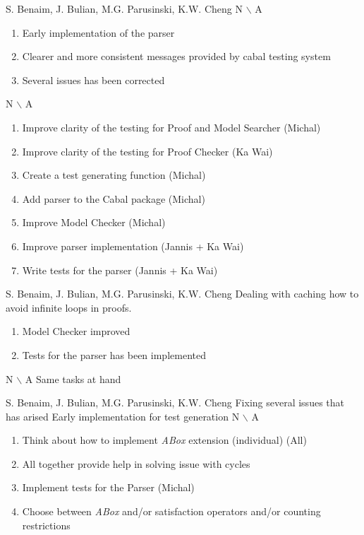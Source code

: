 %
{S. Benaim, J. Bulian, M.G. Parusinski, K.W. Cheng}%
{{N $\backslash$ A}}%
{\begin{enumerate}
\item Early implementation of the parser
\item Clearer and more consistent messages provided by cabal testing system
\item Several issues has been corrected
\end{enumerate}}%
{N $\backslash$ A}
{\begin{enumerate}
\item Improve clarity of the testing for Proof and Model Searcher (Michal)
\item Improve clarity of the testing for Proof Checker (Ka Wai)
\item Create a test generating function (Michal)
\item Add parser to the Cabal package (Michal)
\item Improve Model Checker (Michal)
\item Improve parser implementation (Jannis + Ka Wai)
\item Write tests for the parser (Jannis + Ka Wai)
\end{enumerate}}%

%
{S. Benaim, J. Bulian, M.G. Parusinski, K.W. Cheng}%
{Dealing with caching how to avoid infinite loops in proofs.}%
{\begin{enumerate}
\item Model Checker improved
\item Tests for the parser has been implemented
\end{enumerate}}%
{N $\backslash$ A}
{Same tasks at hand}%

%
{S. Benaim, J. Bulian, M.G. Parusinski, K.W. Cheng}%
{Fixing several issues that has arised
}%
{Early implementation for test generation}%
{N $\backslash$ A}
{\begin{enumerate}
\item Think about how to implement \emph{ABox} extension (individual) (All)
\item All together provide help in solving issue with cycles
\item Implement tests for the Parser (Michal)
\item Choose between \emph{ABox} and/or satisfaction operators and/or counting restrictions
\end{enumerate}}%

